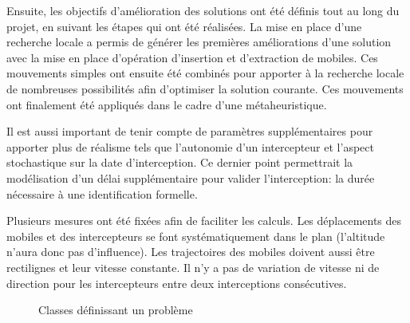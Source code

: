 		Ensuite, les objectifs d'amélioration des solutions ont été définis tout au long du projet, en suivant les étapes qui ont été réalisées. La mise en place d'une recherche locale a permis de générer les premières améliorations d'une solution avec la mise en place d'opération d'insertion et d'extraction de mobiles. Ces mouvements simples ont ensuite été combinés pour apporter à la recherche locale de nombreuses possibilités afin d'optimiser la solution courante. Ces mouvements ont finalement été appliqués dans le cadre d'une métaheuristique.
		
		Il est aussi important de tenir compte de paramètres supplémentaires pour apporter plus de réalisme tels que l'autonomie d'un intercepteur et l'aspect stochastique sur la date d'interception. Ce dernier point permettrait la modélisation d'un délai supplémentaire pour valider l'interception: la durée nécessaire à une identification formelle.
		
		
		Plusieurs mesures ont été fixées afin de faciliter les calculs. Les déplacements des mobiles et des intercepteurs se font systématiquement dans le plan (l'altitude n'aura donc pas d'influence). Les trajectoires des mobiles doivent aussi être rectilignes et leur vitesse constante. Il n'y a pas de variation de vitesse ni de direction pour les intercepteurs entre deux interceptions consécutives.

		\begin{figure}[h!]
			\centering
			\begin{tikzpicture}
				
			\end{tikzpicture}
			\caption{Classes définissant un problème}
			\label{fig:problem-uml}
		\end{figure}


